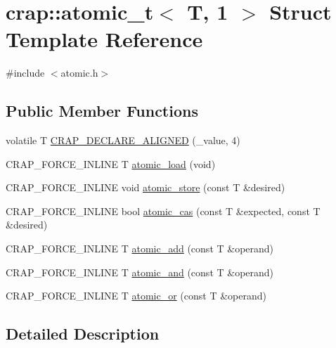 \hypertarget{structcrap_1_1atomic__t_3_01_t_00_011_01_4}{}\section{crap\+:\+:atomic\+\_\+t$<$ T, 1 $>$ Struct Template Reference}
\label{structcrap_1_1atomic__t_3_01_t_00_011_01_4}


{\ttfamily \#include $<$atomic.\+h$>$}

\subsection*{Public Member Functions}
\begin{DoxyCompactItemize}
\item 
volatile T \hyperlink{structcrap_1_1atomic__t_3_01_t_00_011_01_4_afd81f6a8e1e83cea8b19ccd586eb3157}{C\+R\+A\+P\+\_\+\+D\+E\+C\+L\+A\+R\+E\+\_\+\+A\+L\+I\+G\+N\+E\+D} (\+\_\+value, 4)
\item 
C\+R\+A\+P\+\_\+\+F\+O\+R\+C\+E\+\_\+\+I\+N\+L\+I\+N\+E T \hyperlink{structcrap_1_1atomic__t_3_01_t_00_011_01_4_a2cf047092e5bca48244359e8fb19cf19}{atomic\+\_\+load} (void)
\item 
C\+R\+A\+P\+\_\+\+F\+O\+R\+C\+E\+\_\+\+I\+N\+L\+I\+N\+E void \hyperlink{structcrap_1_1atomic__t_3_01_t_00_011_01_4_a3c0b48d359eece05bddc214d51124993}{atomic\+\_\+store} (const T \&desired)
\item 
C\+R\+A\+P\+\_\+\+F\+O\+R\+C\+E\+\_\+\+I\+N\+L\+I\+N\+E bool \hyperlink{structcrap_1_1atomic__t_3_01_t_00_011_01_4_a7225ed266b5dccbb11e493f4b5c1f392}{atomic\+\_\+cas} (const T \&expected, const T \&desired)
\item 
C\+R\+A\+P\+\_\+\+F\+O\+R\+C\+E\+\_\+\+I\+N\+L\+I\+N\+E T \hyperlink{structcrap_1_1atomic__t_3_01_t_00_011_01_4_a269613ef748ea117a2e1c665e1d5b95f}{atomic\+\_\+add} (const T \&operand)
\item 
C\+R\+A\+P\+\_\+\+F\+O\+R\+C\+E\+\_\+\+I\+N\+L\+I\+N\+E T \hyperlink{structcrap_1_1atomic__t_3_01_t_00_011_01_4_ae9f77093d72f7e129d428251704bc321}{atomic\+\_\+and} (const T \&operand)
\item 
C\+R\+A\+P\+\_\+\+F\+O\+R\+C\+E\+\_\+\+I\+N\+L\+I\+N\+E T \hyperlink{structcrap_1_1atomic__t_3_01_t_00_011_01_4_afdc23e5038b16ef27b27326a3edb8fd4}{atomic\+\_\+or} (const T \&operand)
\end{DoxyCompactItemize}


\subsection{Detailed Description}
